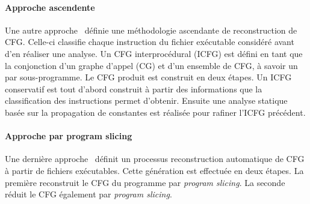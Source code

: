 
      \paragraph{Approche ascendente}
      { Une autre approche~\cite{The00} définie une méthodologie ascendante de
          reconstruction de CFG. Celle-ci classifie chaque instruction du
          fichier exécutable considéré avant d'en réaliser une analyse. Un CFG
          interprocédural (ICFG) est défini en tant que la conjonction d'un
          graphe d'appel (CG) et d'un ensemble de CFG, à savoir un par
          sous-programme. Le CFG produit est construit en deux étapes. Un ICFG
          conservatif est tout d'abord construit à partir des informations que
          la classification des instructions permet d'obtenir. Ensuite une
          analyse statique basée sur la propagation de constantes est réalisée
          pour rafiner l'ICFG précédent. }
    


      \paragraph{Approche par program slicing}
      { Une dernière approche~\cite{CB13} définit un processus reconstruction
        automatique de CFG à partir de fichiers exécutables. Cette génération
        est effectuée en deux étapes. La première reconstruit le CFG du
        programme par \textit{program slicing}. La seconde réduit le CFG
        également par \textit{program slicing}. }




